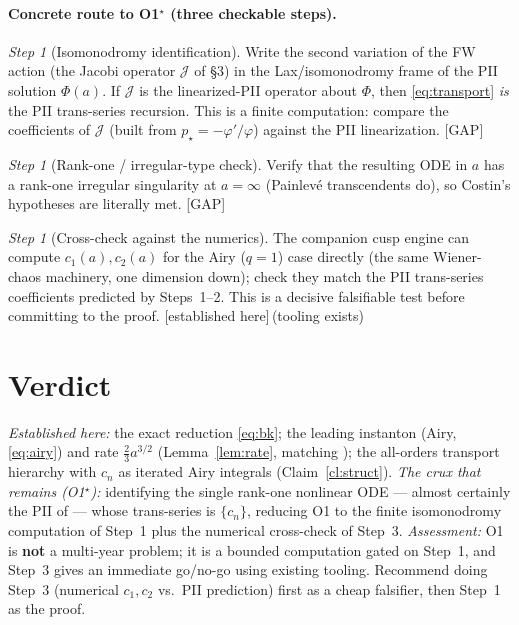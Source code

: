 \documentclass[11pt,reqno]{amsart}
\theoremstyle{plain}
\theoremstyle{remark}
\newtheorem{step}[proposition]{Step}
\newcommand{\OK}{{\footnotesize\textsf{[established here]}}}
\newcommand{\gap}{{\footnotesize\textsf{[GAP]}}}
\begin{document}
\paragraph{Concrete route to O1$^\star$ (three checkable steps).}
\begin{step}[Isomonodromy identification]
Write the second variation of the FW action (the Jacobi operator $\mathcal J$ of \S3) in the
Lax/isomonodromy frame of the PII solution $\Phi(a)$. If $\mathcal J$ is the linearized-PII
operator about $\Phi$, then \eqref{eq:transport} \emph{is} the PII trans-series recursion. This is
a finite computation: compare the coefficients of $\mathcal J$ (built from
$p_\star=-\varphi'/\varphi$) against the PII linearization. \gap
\end{step}
\begin{step}[Rank-one / irregular-type check]
Verify that the resulting ODE in $a$ has a rank-one irregular singularity at $a=\infty$ (Painlev\'e
transcendents do), so Costin's hypotheses \cite{Costin} are literally met. \gap
\end{step}
\begin{step}[Cross-check against the numerics]
The companion cusp engine can compute $c_1(a),c_2(a)$ for the Airy ($q{=}1$) case directly (the
same Wiener-chaos machinery, one dimension down); check they match the PII trans-series
coefficients predicted by Steps~1--2. This is a decisive falsifiable test before committing to the
proof. \OK\,(tooling exists)
\end{step}

\section{Verdict}

\emph{Established here:} the exact reduction \eqref{eq:bk}; the leading instanton (Airy,
\eqref{eq:airy}) and rate $\tfrac23a^{3/2}$ (Lemma~\ref{lem:rate}, matching \cite{DV}); the
all-orders transport hierarchy with $c_n$ as iterated Airy integrals (Claim~\ref{cl:struct}).
\emph{The crux that remains (O1$^\star$):} identifying the single rank-one nonlinear ODE ---
almost certainly the PII of \cite{CLDS} --- whose trans-series is $\{c_n\}$, reducing O1 to the
finite isomonodromy computation of Step~1 plus the numerical cross-check of Step~3.
\emph{Assessment:} O1 is \textbf{not} a multi-year problem; it is a bounded computation gated on
Step~1, and Step~3 gives an immediate go/no-go using existing tooling. Recommend doing Step~3
(numerical $c_1,c_2$ vs.\ PII prediction) first as a cheap falsifier, then Step~1 as the proof.
\end{document}
